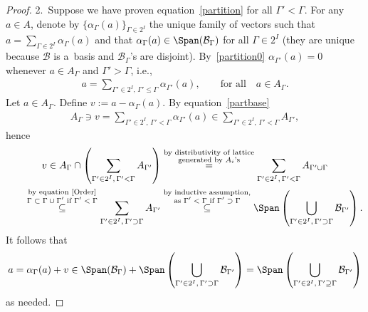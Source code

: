 \begin{proof}
2.~Suppose we have proven equation~\eqref{partition} for all $\Gamma'<\Gamma$.
For any $a\in A$, denote by $\{\alpha_\Gamma(a)\}_{\Gamma\in 2^I}$ the unique family of vectors such that
$a=\sum\limits_{\Gamma\in2^I}\alpha_\Gamma(a)$ and that $\alpha_\Gamma(a)\in \Span(\mathcal{B}_\Gamma)$ for all
$\Gamma\in2^I$ (they are unique because $\mathcal{B}$ is a~basis and $\mathcal{B}_\Gamma$'s are disjoint).
By~\eqref{partition0} $\alpha_{\Gamma'}(a)=0$ whenever $a\in A_\Gamma$ and $\Gamma'>\Gamma$, i.e.,
\begin{gather}
\label{partbase}
a=\sum\limits_{\Gamma'\in2^I,\, \Gamma'\leq\Gamma}\alpha_{\Gamma'}(a),
\qquad
\text{for all}
\quad
a\in A_\Gamma.
\end{gather}
Let $a\in A_\Gamma$.
Def\/ine $v:=a-\alpha_\Gamma(a)$.
By equation~\eqref{partbase}
\begin{gather*}
A_\Gamma\ni v = \sum\limits_{\Gamma'\in 2^I,
\,
\Gamma'<\Gamma}\alpha_{\Gamma'}(a)\in\sum\limits_{\Gamma'\in 2^I,
\,
\Gamma'<\Gamma}A_{\Gamma'},
\end{gather*}
hence
\begin{gather*}
v \in A_\Gamma\cap\left(\sum\limits_{\Gamma'\in 2^I,
\,
\Gamma'<\Gamma}A_{\Gamma'}\right)
\overset{\substack{\text{by distributivity of lattice}\\ \text{generated by $A_i$'s}}}{=}
\sum\limits_{\Gamma'\in 2^I,
\,
\Gamma'<\Gamma}A_{\Gamma'\cup\Gamma}
\\
\qquad \overset{\substack{\text{by equation~\eqref{Order}} \\ \text{$\Gamma\subset\Gamma\cup\Gamma'$ if $\Gamma'<\Gamma$}}}{\subseteq}
\sum\limits_{\Gamma'\in 2^I,
\,
\Gamma'\supset\Gamma}A_{\Gamma'}
 \overset{\substack{\text{by inductive assumption,} \\ \text{as $\Gamma'<\Gamma$ if $\Gamma'\supset\Gamma$}}}{\subseteq}
\Span\left(\bigcup_{\Gamma'\in 2^I,
\,
\Gamma'\supset\Gamma}\mathcal{B}_{\Gamma'} \right).
\end{gather*}
It follows that
\begin{gather*}
a= \alpha_\Gamma(a)+v\in\Span(\mathcal{B}_\Gamma)+\Span\left(\bigcup_{\Gamma'\in 2^I,
\,
\Gamma'\supset\Gamma}\mathcal{B}_{\Gamma'} \right) = \Span\left(\bigcup_{\Gamma'\in 2^I,
\,
\Gamma'\supseteq\Gamma}\mathcal{B}_{\Gamma'} \right)
\end{gather*}
as needed.
\end{proof}

